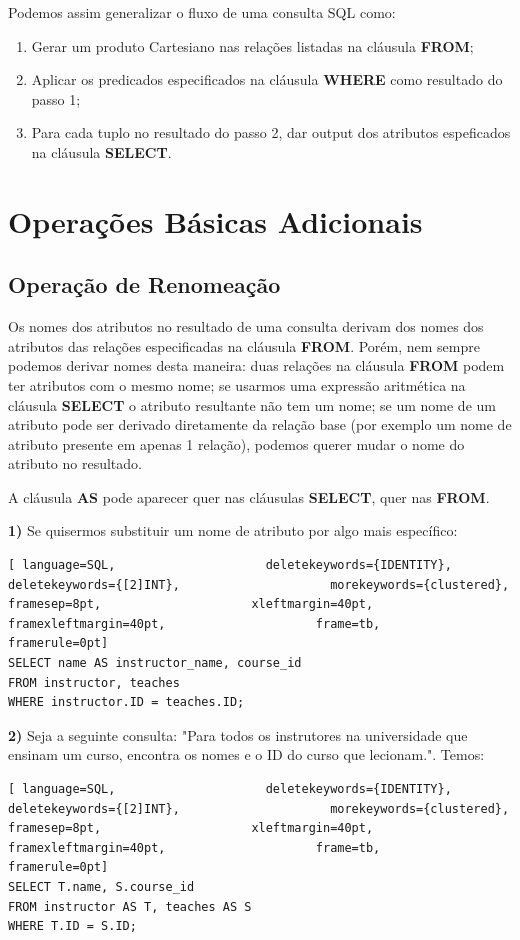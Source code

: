 \documentclass[oneside]{book}
\theoremstyle{definition}
\begin{document}
Podemos assim generalizar o fluxo de uma consulta SQL como:
\begin{enumerate}[label=\color{blue}\theenumi]
    \item Gerar um produto Cartesiano nas relações listadas na cláusula \textbf{FROM};
    \item Aplicar os predicados especificados na cláusula \textbf{WHERE} como resultado do passo 1;
    \item Para cada tuplo no resultado do passo 2, dar output dos atributos espeficados na cláusula \textbf{SELECT}.
\end{enumerate}

\section{Operações Básicas Adicionais}

\subsection{Operação de Renomeação}
Os nomes dos atributos no resultado de uma consulta derivam dos nomes dos atributos das relações especificadas na cláusula \textbf{FROM}.
Porém, nem sempre podemos derivar nomes desta maneira: duas relações na cláusula \textbf{FROM} podem ter atributos com o mesmo nome; se usarmos uma expressão aritmética na cláusula \textbf{SELECT} o atributo resultante não tem um nome; se um nome de um atributo pode ser derivado diretamente da relação base (por exemplo um nome de atributo presente em apenas 1 relação), podemos querer mudar o nome do atributo no resultado.

A cláusula \textbf{AS} pode aparecer quer nas cláusulas \textbf{SELECT}, quer nas \textbf{FROM}.

\textbf{1)} Se quisermos substituir um nome de atributo por algo mais específico:
\begin{lstlisting}[ language=SQL,                     deletekeywords={IDENTITY},                     deletekeywords={[2]INT},                     morekeywords={clustered},                     framesep=8pt,                     xleftmargin=40pt,                     framexleftmargin=40pt,                     frame=tb,                     framerule=0pt]
SELECT name AS instructor_name, course_id
FROM instructor, teaches
WHERE instructor.ID = teaches.ID;
\end{lstlisting}

\textbf{2)} Seja a seguinte consulta: "Para todos os instrutores na universidade que ensinam um curso, encontra os nomes e o ID do curso que lecionam.". Temos:
\begin{lstlisting}[ language=SQL,                     deletekeywords={IDENTITY},                     deletekeywords={[2]INT},                     morekeywords={clustered},                     framesep=8pt,                     xleftmargin=40pt,                     framexleftmargin=40pt,                     frame=tb,                     framerule=0pt]
SELECT T.name, S.course_id
FROM instructor AS T, teaches AS S
WHERE T.ID = S.ID;
\end{lstlisting}
\end{document}
